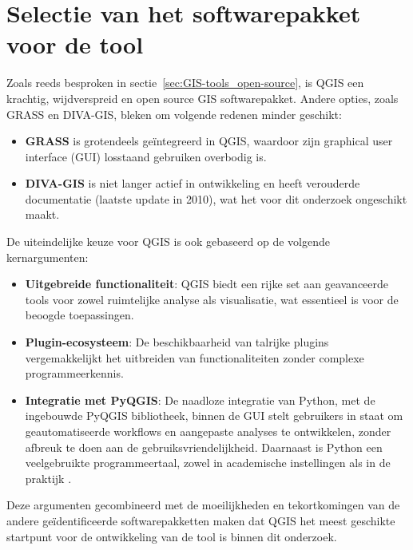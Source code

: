 \section{Selectie van het softwarepakket voor de tool}\label{sec:verg-tool_selectie-swpakket}
Zoals reeds besproken in sectie~\ref{sec:GIS-tools_open-source}, is QGIS een krachtig, wijdverspreid en open source GIS softwarepakket. Andere opties, zoals GRASS en DIVA-GIS, bleken om volgende redenen minder geschikt:
\begin{itemize}
    \item \textbf{GRASS} is grotendeels geïntegreerd in QGIS, waardoor zijn graphical user interface (GUI) losstaand gebruiken overbodig is.
    \item \textbf{DIVA-GIS} is niet langer actief in ontwikkeling en heeft verouderde documentatie (laatste update in 2010), wat het voor dit onderzoek ongeschikt maakt.
\end{itemize}
De uiteindelijke keuze voor QGIS is ook gebaseerd op de volgende kernargumenten:
\begin{itemize}
    \item \textbf{Uitgebreide functionaliteit}: QGIS biedt een rijke set aan geavanceerde tools voor zowel ruimtelijke analyse als visualisatie, wat essentieel is voor de beoogde toepassingen.
    \item \textbf{Plugin-ecosysteem}: De beschikbaarheid van talrijke plugins vergemakkelijkt het uitbreiden van functionaliteiten zonder complexe programmeerkennis.
    \item \textbf{Integratie met PyQGIS}: De naadloze integratie van Python, met de ingebouwde PyQGIS bibliotheek, binnen de GUI stelt gebruikers in staat om geautomatiseerde workflows en aangepaste analyses te ontwikkelen, zonder afbreuk te doen aan de gebruiksvriendelijkheid. Daarnaast is Python een veelgebruikte programmeertaal, zowel in academische instellingen \autocite{Mason2024} als in de praktijk \autocite{Carbonnelle2026}.
\end{itemize}
Deze argumenten gecombineerd met de moeilijkheden en tekortkomingen van de andere geïdentificeerde softwarepakketten maken dat QGIS het meest geschikte startpunt voor de ontwikkeling van de tool is binnen dit onderzoek.